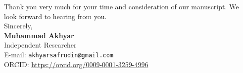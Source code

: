 \documentclass[11pt]{article}
\begin{document}
\bigskip

\noindent Thank you very much for your time and consideration of our manuscript. We look forward to hearing from you. \\

\noindent Sincerely, \\

\noindent \textbf{Muhammad Akhyar} \\
Independent Researcher \\
E-mail: \texttt{akhyarsafrudin@gmail.com} \\
ORCID: \url{https://orcid.org/0009-0001-3259-4996}
\end{document}
